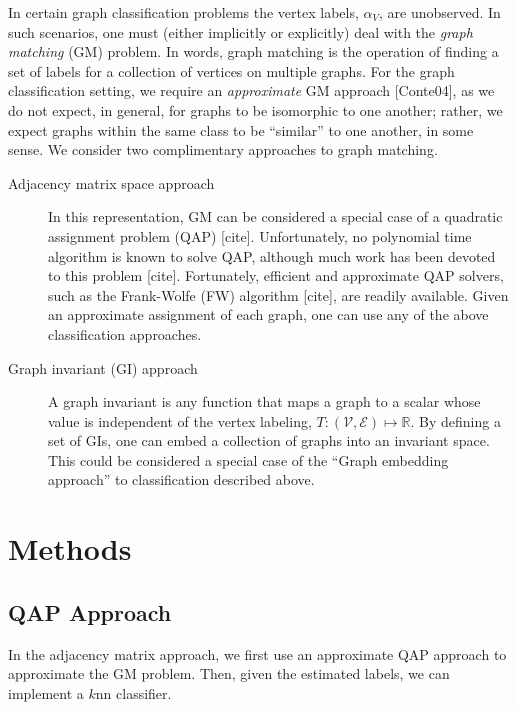 \documentclass{article} %
\providecommand{\mc}[1]{\mathcal{#1}}
\newcommand{\Real}{\mathbb{R}}
\begin{document}
In certain graph classification problems the vertex labels, $\alpha_V$, are unobserved.  In such scenarios, one must (either implicitly or explicitly) deal with the \emph{graph matching} (GM) problem.  In words, graph matching is the operation of finding a set of labels for a collection of vertices on multiple graphs.  For the graph classification setting, we require an \emph{approximate} GM approach [Conte04], as we do not expect, in general, for graphs to be isomorphic to one another; rather, we expect graphs within the same class to be ``similar'' to one another, in some sense.  We consider two complimentary approaches to graph matching.
\begin{description}
	\item[Adjacency matrix space approach]  In this representation, GM can be considered a special case of a quadratic assignment problem (QAP) [cite].   Unfortunately, no polynomial time algorithm is known to solve QAP, although much work has been devoted to this problem [cite]. Fortunately, efficient and approximate QAP solvers, such as the Frank-Wolfe (FW) algorithm [cite], are readily available.  Given an approximate assignment of each graph, one can use any of the above classification approaches.
	\item[Graph invariant (GI) approach] A graph invariant is any function that maps a graph to a scalar whose value is independent of the vertex labeling, $T: (\mc{V},\mc{E}) \mapsto \Real$.  By defining a set of GIs, one can embed a collection of graphs into an invariant space.  This could be considered a special case of the ``Graph embedding approach'' to classification described above.		
\end{description}



\section{Methods} %
\label{sec:methods}

\subsection{QAP Approach} %
\label{sec:quadratic_assignment_problem}

In the adjacency matrix approach, we first use an approximate QAP approach to approximate the GM problem.  Then, given the estimated labels, we can implement a $k$nn classifier. 
\end{document}
